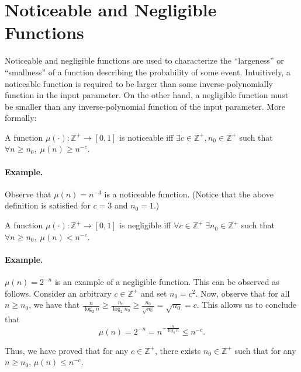 \section{Noticeable and Negligible Functions}
\label{ssec:nnf}
Noticeable and negligible functions are used to characterize the ``largeness'' or ``smallness'' of a function describing the probability of some event.  Intuitively, a noticeable function is required to be larger than some inverse-polynomially function in the input parameter. On the other hand, a negligible function must be smaller than any inverse-polynomial function of the input parameter. More formally:


\begin{definition}
A function $\mu(\cdot): \mathbb{Z}^+ \rightarrow [0,1]$ is noticeable iff $\exists c \in \mathbb{Z}^+, n_0 \in \mathbb{Z}^+$ such that $\forall n \geq n_0 , \; \mu(n) \geq n^{-c}$.
\end{definition}

\paragraph{Example.} Observe that $\mu(n) = n^{-3}$ is a noticeable function.  (Notice that the above definition is satisfied for $c = 3$ and $n_0 = 1$.)

\begin{definition}
A function $\mu(\cdot): \mathbb{Z}^+ \rightarrow [0,1]$ is negligible iff $\forall c \in \mathbb{Z}^+ \; \exists n_0 \in \mathbb{Z}^+$ such that $\forall n \geq n_0 , \; \mu(n) < n^{-c}$.
\end{definition}

\paragraph{Example.} $\mu(n) = 2^{-n}$ is an example of a negligible function. This can be observed as follows.
Consider an arbitrary $c \in \mathbb{Z}^+$ and set $n_0 = c^2$. Now, observe that for all $n \geq n_0$, we have that $\frac{n}{\log_2 n} \geq \frac{n_0}{\log_2 n_0} \geq \frac{n_0}{\sqrt{n_0}} = \sqrt{n_0} = c$. This allows us to conclude that $$\mu(n) = 2^{-n} = n^{-\frac{n}{\log_2 n}} \leq n^{-c}.$$

Thus, we have proved that for any $c \in \mathbb{Z}^+$, there exists $n_0 \in \mathbb{Z}^+$ such that for any $n \geq n_0$, $\mu(n) \leq n^{-c}$.

